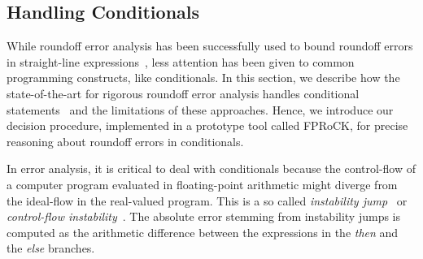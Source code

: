 \subsection{Handling Conditionals}
\label{conditionals}
%
While roundoff error analysis has been successfully used to bound roundoff errors in straight-line expressions~\cite{darulova2018daisy,2015_fm_sjrg,solovyev2018rigorous,rosa,precisa,gappa,fluctuat}, less attention has been given to common programming constructs, like conditionals.
%
In this section, we describe how the state-of-the-art for rigorous roundoff error analysis handles conditional statements~\cite{precisa, fluctuat} and the limitations of these approaches.
%
Hence, we introduce our decision procedure, implemented in a prototype tool called FPRoCK, for precise reasoning about roundoff errors in conditionals.
%

In error analysis, it is critical to deal with conditionals because the control-flow of a computer program evaluated in floating-point arithmetic might diverge from the ideal-flow in the real-valued program.
%
%
This is a so called \emph{instability jump}~\cite{satire} or \emph{control-flow instability}~\cite{unstable}.
%
The absolute error stemming from instability jumps is computed as the arithmetic difference between the expressions in the \emph{then} and the \emph{else} branches.
%
%


